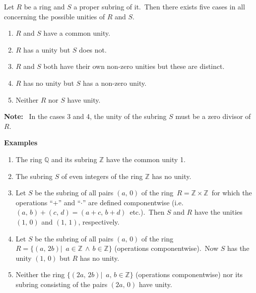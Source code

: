 \documentclass[12pt]{article}
\begin{document}
Let $R$ be a ring and $S$ a proper subring of it. \,Then there exists five cases in all concerning the possible unities of $R$ and $S$.
\begin{enumerate}
 \item $R$ and $S$ have a common unity.
 \item $R$ has a unity but $S$ does not.
 \item $R$ and $S$ both have their own non-zero unities but these are distinct.
 \item $R$ has no unity but $S$ has a non-zero unity.
 \item Neither $R$ nor $S$ have unity.
\end{enumerate}
\textbf{Note:} \, In the cases 3 and 4, the unity of the subring $S$ must be a zero divisor of $R$.

\textbf{Examples}
\begin{enumerate}
 \item The ring $\mathbb{Q}$ and its subring $\mathbb{Z}$ have the common 
unity 1.
 \item The subring $S$ of even integers of the ring $\mathbb{Z}$ has no unity.
 \item Let $S$ be the subring of all pairs $(a,\,0)$ of the ring 
\,$R = \mathbb{Z}\times\mathbb{Z}$\, for which the operations ``$+$'' and ``$\cdot$'' are defined componentwise (i.e. \,$(a,\,b)+(c,\,d) = (a+c,\,b+d)$\, etc.). \,Then $S$ and $R$ have the unities $(1,\,0)$ and $(1,\,1)$, respectively.
 \item Let $S$ be the subring of all pairs $(a,\,0)$ of the ring \,$R = \{(a,\,2b)|\,\,\,a\in\mathbb{Z}\,\land \,b\in\mathbb{Z}\}$ (operations componentwise). \,Now $S$ has the unity $(1,\,0)$ but $R$ has no unity.
 \item Neither the ring $\{(2a,\,2b)|\,\,\,a,\,b\in\mathbb{Z}\}$ (operations componentwise) nor its subring consisting of the pairs $(2a,\,0)$ have unity.
\end{enumerate}
\end{document}
